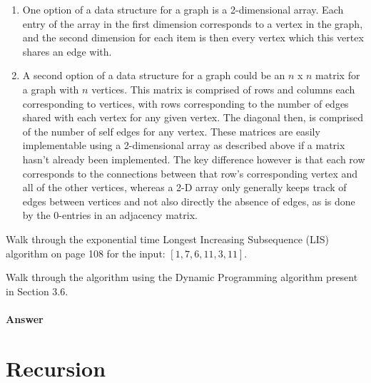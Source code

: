 \documentclass{article}
\begin{document}

\begin{enumerate}
	\item
		One option of a data structure for a graph is a 2-dimensional array. Each entry of the array in the first
		dimension corresponds to a vertex in the graph, and the second dimension for each item is then every vertex
		which this vertex shares an edge with.
	\item
		A second option of a data structure for a graph could be an $n$ x $n$ matrix for a graph with $n$ vertices.
		This matrix is comprised of rows and columns each corresponding to vertices, with rows corresponding to the
		number of edges shared with each vertex for any given vertex. The diagonal then, is comprised of the number
		of self edges for any vertex. These matrices are easily implementable using a 2-dimensional array as
		described above if a matrix hasn't already been implemented. The key difference however is that each row
		corresponds to the connections between that row's corresponding vertex and all of the other vertices, whereas
		a 2-D array only generally keeps track of edges between vertices and not also directly the absence of edges,
		as is done by the 0-entries in an adjacency matrix.
\end{enumerate}



\nextprob
{}

Walk through the exponential time Longest Increasing Subsequence (LIS) algorithm
on page 108 for the input: $\left[ 1, 7, 6, 11, 3, 11 \right]$.

Walk through the algorithm using the Dynamic Programming algorithm present in
Section 3.6.

\paragraph{Answer}
\section{Recursion}
\end{document}
